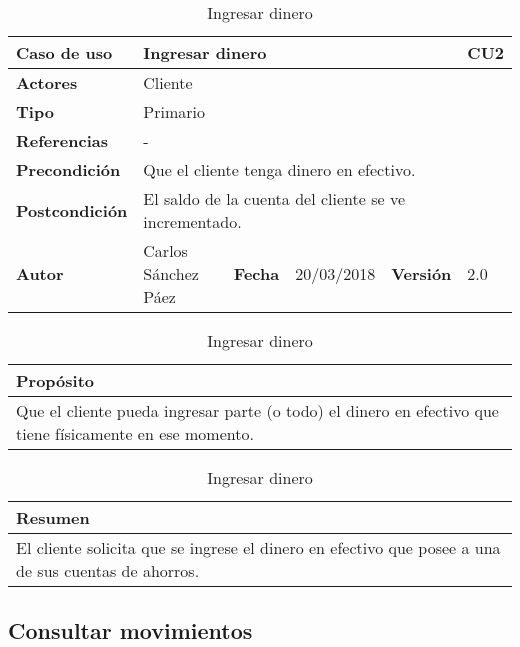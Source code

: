 \documentclass[12pt,spanish]{article}
\begin{document}
\begin{table}[H]
\centering
\begin{tabular}{|m{3cm}|m{4cm}|m{2cm}|m{2cm}|m{2cm}|m{1cm}|}
\hline
\textbf{Caso de uso} &  \multicolumn{4}{m{8cm}|}{Ingresar dinero} \vline &  \cellcolor{gray!40}CU2 \\
\hline
\textbf{Actores} & \multicolumn{5}{m{8cm}|}{Cliente} \\
\hline
\textbf{Tipo} & \multicolumn{5}{m{8cm}|}{Primario} \\
\hline
\textbf{Referencias} &\multicolumn{5}{m{8cm}|}{-} \\
\hline
\textbf{Precondición} & \multicolumn{5}{m{8cm}|}{Que el cliente tenga dinero en efectivo.} \\
\hline
\textbf{Postcondición} & \multicolumn{5}{m{8cm}|}{El saldo de la cuenta del cliente se ve incrementado.} \\
\hline
\textbf{Autor} & Carlos Sánchez Páez & \textbf{Fecha} & 20/03/2018 & \textbf{Versión} & 2.0 \\
\hline
\end{tabular}

\vspace{1cm}

\begin{tabular}{|m{16.2cm}|}
\hline
\textbf{Propósito} \\
\hline
Que el cliente pueda ingresar parte (o todo) el dinero en efectivo que tiene físicamente en ese momento. \\
\hline
\end{tabular}

\vspace{1cm}

\begin{tabular}{|m{16.2cm}|}
\hline
\textbf{Resumen} \\
\hline
El cliente solicita que se ingrese el dinero en efectivo que posee a una de sus cuentas de ahorros. \\
\hline
\end{tabular}

\caption{Ingresar dinero}

\end{table}

\subsection{Consultar movimientos}
\end{document}
